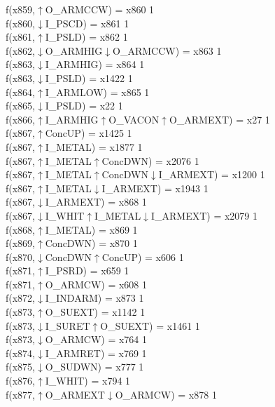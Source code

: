 f(x859,$\uparrow$O\_ARMCCW) = x860 {1} \\
f(x860,$\downarrow$I\_PSCD) = x861 {1} \\
f(x861,$\uparrow$I\_PSLD) = x862 {1} \\
f(x862,$\downarrow$O\_ARMHIG$\downarrow$O\_ARMCCW) = x863 {1} \\
f(x863,$\downarrow$I\_ARMHIG) = x864 {1} \\
f(x863,$\downarrow$I\_PSLD) = x1422 {1} \\
f(x864,$\uparrow$I\_ARMLOW) = x865 {1} \\
f(x865,$\downarrow$I\_PSLD) = x22 {1} \\
f(x866,$\uparrow$I\_ARMHIG$\uparrow$O\_VACON$\uparrow$O\_ARMEXT) = x27 {1} \\
f(x867,$\uparrow$ConcUP) = x1425 {1} \\
f(x867,$\uparrow$I\_METAL) = x1877 {1} \\
f(x867,$\uparrow$I\_METAL$\uparrow$ConcDWN) = x2076 {1} \\
f(x867,$\uparrow$I\_METAL$\uparrow$ConcDWN$\downarrow$I\_ARMEXT) = x1200 {1} \\
f(x867,$\uparrow$I\_METAL$\downarrow$I\_ARMEXT) = x1943 {1} \\
f(x867,$\downarrow$I\_ARMEXT) = x868 {1} \\
f(x867,$\downarrow$I\_WHIT$\uparrow$I\_METAL$\downarrow$I\_ARMEXT) = x2079 {1} \\
f(x868,$\uparrow$I\_METAL) = x869 {1} \\
f(x869,$\uparrow$ConcDWN) = x870 {1} \\
f(x870,$\downarrow$ConcDWN$\uparrow$ConcUP) = x606 {1} \\
f(x871,$\uparrow$I\_PSRD) = x659 {1} \\
f(x871,$\uparrow$O\_ARMCW) = x608 {1} \\
f(x872,$\downarrow$I\_INDARM) = x873 {1} \\
f(x873,$\uparrow$O\_SUEXT) = x1142 {1} \\
f(x873,$\downarrow$I\_SURET$\uparrow$O\_SUEXT) = x1461 {1} \\
f(x873,$\downarrow$O\_ARMCW) = x764 {1} \\
f(x874,$\downarrow$I\_ARMRET) = x769 {1} \\
f(x875,$\downarrow$O\_SUDWN) = x777 {1} \\
f(x876,$\uparrow$I\_WHIT) = x794 {1} \\
f(x877,$\uparrow$O\_ARMEXT$\downarrow$O\_ARMCW) = x878 {1} \\
